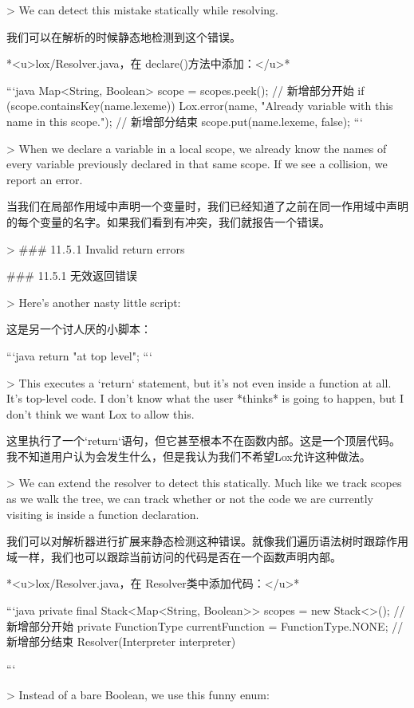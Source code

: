 \documentclass[cn,11pt,chinese]{elegantbook}
\begin{document}
{{{{{{{{{{{{{{{> We can detect this mistake statically while resolving.

我们可以在解析的时候静态地检测到这个错误。

*<u>lox/Resolver.java，在 declare()方法中添加：</u>*

```java
    Map<String, Boolean> scope = scopes.peek();
    // 新增部分开始
    if (scope.containsKey(name.lexeme)) {
      Lox.error(name,
          "Already variable with this name in this scope.");
    }
    // 新增部分结束
    scope.put(name.lexeme, false);
```

> When we declare a variable in a local scope, we already know the names of every variable previously declared in that same scope. If we see a collision, we report an error.

当我们在局部作用域中声明一个变量时，我们已经知道了之前在同一作用域中声明的每个变量的名字。如果我们看到有冲突，我们就报告一个错误。

> ### 11 . 5 . 1 Invalid return errors

### 11.5.1 无效返回错误

> Here’s another nasty little script:

这是另一个讨人厌的小脚本：

```java
return "at top level";
```

> This executes a `return` statement, but it’s not even inside a function at all. It’s top-level code. I don’t know what the user *thinks* is going to happen, but I don’t think we want Lox to allow this.

这里执行了一个`return`语句，但它甚至根本不在函数内部。这是一个顶层代码。我不知道用户认为会发生什么，但是我认为我们不希望Lox允许这种做法。

> We can extend the resolver to detect this statically. Much like we track scopes as we walk the tree, we can track whether or not the code we are currently visiting is inside a function declaration.

我们可以对解析器进行扩展来静态检测这种错误。就像我们遍历语法树时跟踪作用域一样，我们也可以跟踪当前访问的代码是否在一个函数声明内部。

*<u>lox/Resolver.java，在 Resolver类中添加代码：</u>*

```java
  private final Stack<Map<String, Boolean>> scopes = new Stack<>();
  // 新增部分开始
  private FunctionType currentFunction = FunctionType.NONE;
  // 新增部分结束
  Resolver(Interpreter interpreter) {
```

> Instead of a bare Boolean, we use this funny enum:

}}}}}}}}}}}}}}}}
\end{document}
